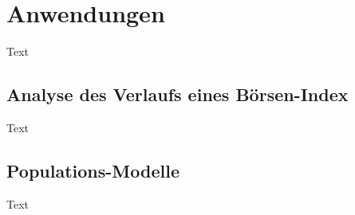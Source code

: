 %
%
%
%
\section{Anwendungen 
\label{brown:section:teil2}}

Text

\subsection{Analyse des Verlaufs eines Börsen-Index
\label{brown:subsection:bonorum}}

Text

\subsection{Populations-Modelle
	\label{brown:subsection:bonorum}}

Text
